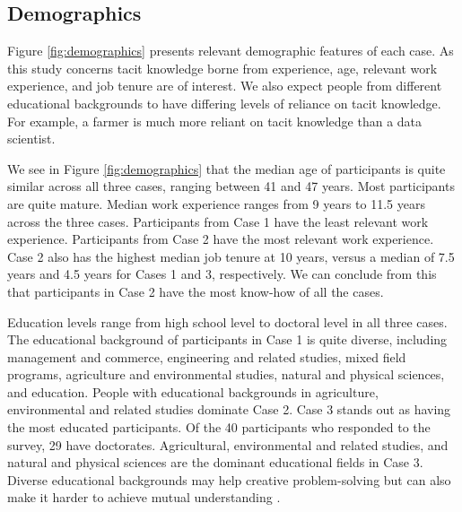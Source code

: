 \subsection{Demographics}

Figure \ref{fig:demographics} presents relevant demographic features of each case. As this study concerns tacit knowledge borne from experience, age, relevant work experience, and job tenure are of interest. We also expect people from different educational backgrounds to have differing levels of reliance on tacit knowledge. For example, a farmer is much more reliant on tacit knowledge than a data scientist. \medskip

We see in Figure \ref{fig:demographics} that the median age of participants is quite similar across all three cases, ranging between 41 and 47 years. Most participants are quite mature. Median work experience ranges from 9 years to 11.5 years across the three cases. Participants from Case 1 have the least relevant work experience. Participants from Case 2 have the most relevant work experience. Case 2 also has the highest median job tenure at 10 years, versus a median of 7.5 years and 4.5 years for Cases 1 and 3, respectively. We can conclude from this that participants in Case 2 have the most know-how of all the cases. \medskip

Education levels range from high school level to doctoral level in all three cases. The educational background of participants in Case 1 is quite diverse, including management and commerce, engineering and related studies, mixed field programs, agriculture and environmental studies, natural and physical sciences, and education. People with educational backgrounds in agriculture, environmental and related studies dominate Case 2. Case 3 stands out as having the most educated participants. Of the 40 participants who responded to the survey, 29 have doctorates. Agricultural, environmental and related studies, and natural and physical sciences are the dominant educational fields in Case 3. Diverse educational backgrounds may help creative problem-solving but can also make it harder to achieve mutual understanding \citep{mors2010innovation,jen2014social}.

